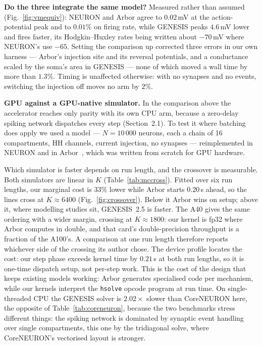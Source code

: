 \documentclass[preprint,12pt, a4paper]{elsarticle}
\begin{document}
\begin{enumerate}
\textbf{Do the three integrate the same model?} Measured rather than assumed (Fig.~\ref{fig:vmequiv}): NEURON and Arbor agree to $0.02$\,mV at the action-potential peak and to $0.01\%$ on firing rate, while GENESIS peaks $4.6$\,mV lower and fires faster, its Hodgkin--Huxley rates being written about $-70$\,mV where NEURON's use $-65$. Setting the comparison up corrected three errors in our own harness --- Arbor's injection site and its reversal potentials, and a conductance scaled by the soma's area in GENESIS --- none of which moved a wall time by more than $1.3\%$. Timing is unaffected otherwise: with no synapses and no events, switching the injection off moves no arm by $2\%$.

\textbf{GPU against a GPU-native simulator.} In the comparison above the accelerator reaches only parity with its own CPU arm, because a zero-delay spiking network dispatches every step (Section~2.1). To test it where batching does apply we used a model --- $N=10\,000$ neurons, each a chain of 16 compartments, HH channels, current injection, no synapses --- reimplemented in NEURON and in Arbor~\cite{arbor2019}, which was written from scratch for GPU hardware.

Which simulator is faster depends on run length, and the crossover is measurable. Both simulators are linear in $K$ (Table~\ref{tab:mccross}). Fitted over six run lengths, our marginal cost is $33\%$ lower while Arbor starts $0.20$\,s ahead, so the lines cross at $K\approx6400$ (Fig.~\ref{fig:crossover}). Below it Arbor wins on setup; above it, where modelling studies sit, GENESIS~2.5 is faster. The A40 gives the same ordering with a wider margin, crossing at $K\approx1800$: our kernel is fp32 where Arbor computes in double, and that card's double-precision throughput is a fraction of the A100's. A comparison at one run length therefore reports whichever side of the crossing its author chose. The device profile locates the cost: our step phase exceeds kernel time by $0.21$\,s at both run lengths, so it is one-time dispatch setup, not per-step work. This is the cost of the design that keeps existing models working: Arbor generates specialised code per mechanism, while our kernels interpret the \texttt{hsolve} opcode program at run time. On single-threaded CPU the GENESIS solver is $2.02\times$ slower than CoreNEURON here, the opposite of Table~\ref{tab:coreneuron}, because the two benchmarks stress different things: the spiking network is dominated by synaptic event handling over single compartments, this one by the tridiagonal solve, where CoreNEURON's vectorised layout is stronger.


\end{enumerate}
\end{document}
